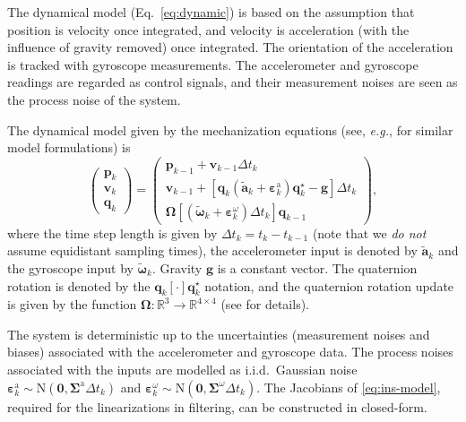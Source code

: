 \documentclass[conference]{ieeetran}
\newcommand{\R}{\mathbb{R}}
\newcommand{\N}{\mathrm{N}}
\newcommand{\mbf}[1]{\mathbf{#1}}
\newcommand{\vect}[1]{\mbf{#1}}
\newcommand{\vectb}[1]{\bm{#1}}
\newcommand{\eg}{\textit{e.g.}}
\begin{document}
The dynamical model (Eq.~\ref{eq:dynamic}) is based on the assumption that position is velocity once integrated, and velocity is acceleration (with the influence of gravity removed) once integrated. The orientation of the acceleration is tracked with gyroscope measurements. The accelerometer and gyroscope readings are regarded as control signals, and their measurement noises are seen as the process noise of the system.

The dynamical model given by the mechanization equations (see, \eg, \cite{Titterton+Weston:2004,Nilsson+Zachariah+Skog+Handel:2013} for similar model formulations) is
\begin{equation}\label{eq:ins-model}
  \begin{pmatrix}
    \vect{p}_k \\ \vect{v}_k \\ \vect{q}_k
  \end{pmatrix}
  =
  \begin{pmatrix}
    \vect{p}_{k-1} + \vect{v}_{k-1}\Delta t_k \\
    \vect{v}_{k-1} + [\vect{q}_k (\tilde{\vect{a}}_k + \vectb{\varepsilon}^\mathrm{a}_k) \vect{q}_k^\star - \vect{g}] \Delta t_k \\
    \vectb{\Omega}[(\tilde{\vectb{\omega}}_k + \vectb{\varepsilon}^\omega_k) \Delta t_k] \vect{q}_{k-1}
  \end{pmatrix},
\end{equation}
where the time step length is given by $\Delta t_k = t_{k} - t_{k-1}$ (note that we {\em do not} assume equidistant sampling times), the accelerometer input is denoted by $\tilde{\vect{a}}_k$ and the gyroscope input by $\tilde{\vectb{\omega}}_k$. Gravity $\vect{g}$ is a constant vector. The quaternion rotation is denoted by the $\vect{q}_k [\cdot] \vect{q}_k^\star$ notation, and the quaternion rotation update is given by the function $\vectb{\Omega}: \R^3 \to \R^{4 \times 4}$ (see \cite{Titterton+Weston:2004} for details). 


The system is deterministic up to the uncertainties (measurement noises and biases) associated with the accelerometer and gyroscope data. The process noises associated with the inputs are modelled as i.i.d.\ Gaussian noise $\vectb{\varepsilon}^\mathrm{a}_k \sim \N(\vectb{0},\vectb{\Sigma}^\mathrm{a} \Delta t_k)$ and $\vectb{\varepsilon}^\omega_k \sim \N(\vectb{0},\vectb{\Sigma}^\omega \Delta t_k)$. The Jacobians of \eqref{eq:ins-model}, required for the linearizations in filtering, can be constructed in closed-form.
\end{document}
